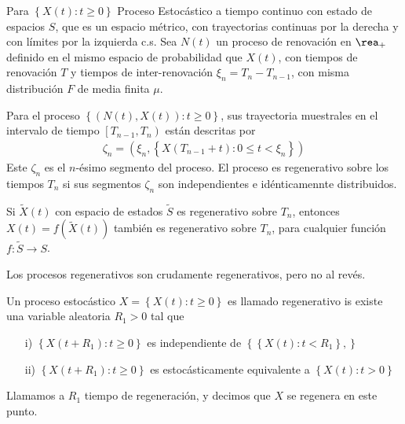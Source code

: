 Para $\left\{X\left(t\right):t\geq0\right\}$ Proceso Estoc\'astico a tiempo continuo con estado de espacios $S$, que es un espacio m\'etrico, con trayectorias continuas por la derecha y con l\'imites por la izquierda c.s. Sea $N\left(t\right)$ un proceso de renovaci\'on en $\rea_{+}$ definido en el mismo espacio de probabilidad que $X\left(t\right)$, con tiempos de renovaci\'on $T$ y tiempos de inter-renovaci\'on $\xi_{n}=T_{n}-T_{n-1}$, con misma distribuci\'on $F$ de media finita $\mu$.



\begin{Def}
Para el proceso $\left\{\left(N\left(t\right),X\left(t\right)\right):t\geq0\right\}$, sus trayectoria muestrales en el intervalo de tiempo $\left[T_{n-1},T_{n}\right)$ est\'an descritas por
\begin{eqnarray*}
\zeta_{n}=\left(\xi_{n},\left\{X\left(T_{n-1}+t\right):0\leq t<\xi_{n}\right\}\right)
\end{eqnarray*}
Este $\zeta_{n}$ es el $n$-\'esimo segmento del proceso. El proceso es regenerativo sobre los tiempos $T_{n}$ si sus segmentos $\zeta_{n}$ son independientes e id\'enticamennte distribuidos.
\end{Def}


\begin{Note}
Si $\tilde{X}\left(t\right)$ con espacio de estados $\tilde{S}$ es regenerativo sobre $T_{n}$, entonces $X\left(t\right)=f\left(\tilde{X}\left(t\right)\right)$ tambi\'en es regenerativo sobre $T_{n}$, para cualquier funci\'on $f:\tilde{S}\rightarrow S$.
\end{Note}

\begin{Note}
Los procesos regenerativos son crudamente regenerativos, pero no al rev\'es.
\end{Note}

\begin{Def}
Un proceso estoc\'astico $X=\left\{X\left(t\right):t\geq0\right\}$ es llamado regenerativo is existe una variable aleatoria $R_{1}>0$ tal que
\begin{itemize}
\item[i)] $\left\{X\left(t+R_{1}\right):t\geq0\right\}$ es independiente de $\left\{\left\{X\left(t\right):t<R_{1}\right\},\right\}$
\item[ii)] $\left\{X\left(t+R_{1}\right):t\geq0\right\}$ es estoc\'asticamente equivalente a $\left\{X\left(t\right):t>0\right\}$
\end{itemize}

Llamamos a $R_{1}$ tiempo de regeneraci\'on, y decimos que $X$ se regenera en este punto.
\end{Def}


